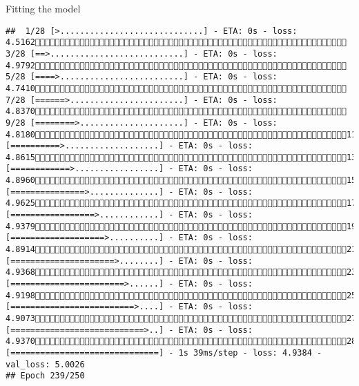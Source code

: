\documentclass[
  ignorenonframetext,
]{beamer}
\begin{document}
\begin{frame}[fragile]{Fitting the model}
\begin{verbatim}
##  1/28 [>.............................] - ETA: 0s - loss: 4.5162 3/28 [==>...........................] - ETA: 0s - loss: 4.9792 5/28 [====>.........................] - ETA: 0s - loss: 4.7410 7/28 [======>.......................] - ETA: 0s - loss: 4.8370 9/28 [========>.....................] - ETA: 0s - loss: 4.818011/28 [==========>...................] - ETA: 0s - loss: 4.861513/28 [============>.................] - ETA: 0s - loss: 4.896015/28 [===============>..............] - ETA: 0s - loss: 4.962517/28 [=================>............] - ETA: 0s - loss: 4.937919/28 [===================>..........] - ETA: 0s - loss: 4.891421/28 [=====================>........] - ETA: 0s - loss: 4.936823/28 [=======================>......] - ETA: 0s - loss: 4.919825/28 [=========================>....] - ETA: 0s - loss: 4.907327/28 [===========================>..] - ETA: 0s - loss: 4.937028/28 [==============================] - 1s 39ms/step - loss: 4.9384 - val_loss: 5.0026
## Epoch 239/250

\end{verbatim}
\end{frame}
\end{document}
